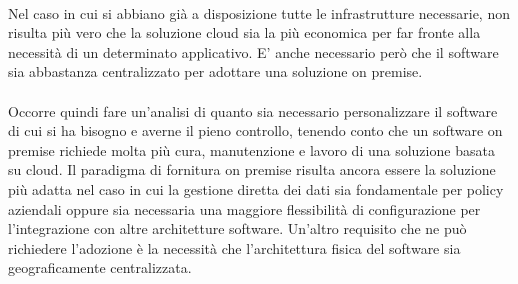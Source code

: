 \paragraph{}
Nel caso in cui si abbiano già a disposizione tutte le infrastrutture necessarie, non risulta più vero che la soluzione cloud sia la più economica per far fronte alla necessità di un determinato applicativo. E' anche necessario però che il software sia abbastanza centralizzato per adottare una soluzione on premise.

\paragraph{}
Occorre quindi fare un'analisi di quanto sia necessario personalizzare il software di cui si ha bisogno e averne il pieno controllo, tenendo conto che un software on premise richiede molta più cura, manutenzione e lavoro di una soluzione basata su cloud. Il paradigma di fornitura on premise risulta ancora essere la soluzione più adatta nel caso in cui la gestione diretta dei dati sia fondamentale per policy aziendali oppure sia necessaria una maggiore flessibilità di configurazione per l’integrazione con altre architetture software. Un'altro requisito che ne può richiedere l'adozione è la necessità che l'architettura fisica del software sia geograficamente centralizzata.
